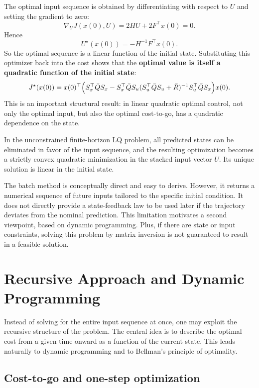 The optimal input sequence is obtained by differentiating with respect to $U$ and setting the gradient to zero:
\[
\nabla_U J(x(0),U)=2HU+2F^\top x(0)=0.
\]
Hence
\[
U^\star(x(0)) = -H^{-1}F^\top x(0).
\]
So the optimal sequence is a linear function of the initial state. Substituting this optimizer back into the cost shows that the \textbf{optimal value is itself a quadratic function of the initial state}:
\[
J^\star(x(0))
=
x(0)^\top
\Bigl(
S_x^\top \bar{Q} S_x
-
S_x^\top \bar{Q}S_u
(S_u^\top \bar{Q}S_u+\bar{R})^{-1}
S_u^\top \bar{Q}S_x
\Bigr)
x(0).
\]
This is an important structural result: in linear quadratic optimal control, not only the optimal input, but also the optimal cost-to-go, has a quadratic dependence on the state.

\begin{theorembox}
In the unconstrained finite-horizon LQ problem, all predicted states can be eliminated in favor of the input sequence, and the resulting optimization becomes a strictly convex quadratic minimization in the stacked input vector $U$. Its unique solution is linear in the initial state.
\end{theorembox}

The batch method is conceptually direct and easy to derive. However, it returns a numerical sequence of future inputs tailored to the specific initial condition. It does not directly provide a state-feedback law to be used later if the trajectory deviates from the nominal prediction. This limitation motivates a second viewpoint, based on dynamic programming. Plus, if there are state or input constraints, solving this problem by matrix inversion is not guaranteed to result in a feasible solution.

\section{Recursive Approach and Dynamic Programming}

Instead of solving for the entire input sequence at once, one may exploit the recursive structure of the problem. The central idea is to describe the optimal cost from a given time onward as a function of the current state. This leads naturally to dynamic programming and to Bellman’s principle of optimality.

\subsection{Cost-to-go and one-step optimization}

